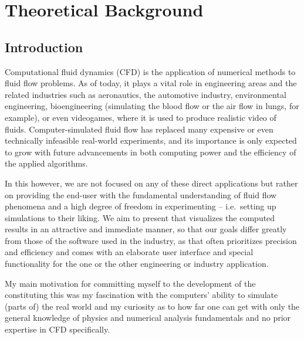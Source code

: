 \documentclass[11pt,a4paper,twoside,openright]{report}
\begin{document}


\setcounter{tocdepth}{2}
\tableofcontents

\chapter{Theoretical Background}
\pagestyle{fancy}

\section{Introduction}
Computational fluid dynamics (CFD) is the application of numerical methods to fluid flow problems. As of today, it plays a vital role in engineering areas and the related industries such as aeronautics, the automotive industry, environmental engineering, bioengineering (simulating the blood flow or the air flow in lungs, for example), or even videogames, where it is used to produce realistic video of fluids. Computer-simulated fluid flow has replaced many expensive or even technically infeasible real-world experiments, and its importance is only expected to grow with future advancements in both computing power and the efficiency of the applied algorithms.

In this \this{} however, we are not focused on any of these direct applications but rather on providing the end-user with the fundamental understanding of fluid flow phenomena and a high degree of freedom in experimenting -- i.e.\ setting up simulations to their liking. We aim to present \software{} that visualizes the computed results in an attractive and immediate manner, so that our goals differ greatly from those of the software used in the industry, as that often prioritizes precision and efficiency and comes with an elaborate user interface and special functionality for the one or the other engineering or industry application.

My main motivation for committing myself to the development of the \software{} constituting this \this{} was my fascination with the computers' ability to simulate (parts of) the real world and my curiosity as to how far one can get with only the general knowledge of physics and numerical analysis fundamentals and no prior expertise in CFD specifically.
\end{document}
